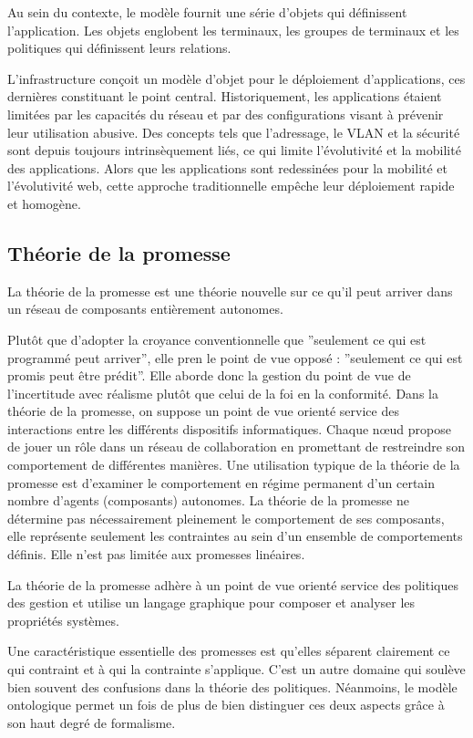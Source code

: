Au sein du contexte, le modèle fournit une série d'objets qui définissent
l'application. Les objets englobent les terminaux, les groupes de terminaux et
les politiques qui définissent leurs relations.

L'infrastructure conçoit un modèle d'objet pour le déploiement d'applications,
ces dernières constituant le point central. Historiquement, les applications
étaient limitées par les capacités du réseau et par des configurations visant à
prévenir leur utilisation abusive. Des concepts tels que l'adressage, le VLAN et
la sécurité sont depuis toujours intrinsèquement liés, ce qui limite
l'évolutivité et la mobilité des applications. Alors que les applications sont
redessinées pour la mobilité et l'évolutivité web, cette approche traditionnelle
empêche leur déploiement rapide et homogène.

\subsection{Théorie de la promesse}

La théorie de la promesse est une théorie nouvelle sur ce qu'il peut arriver
dans un réseau de composants entièrement autonomes.

Plutôt que d'adopter la croyance conventionnelle que ''seulement ce qui est
programmé peut arriver'', elle pren le point de vue opposé : ''seulement ce
qui est promis peut être prédit''. Elle aborde donc la gestion du point de vue
de l'incertitude avec réalisme plutôt que celui de la foi en la conformité. Dans
la théorie de la promesse, on suppose un point de vue orienté service des
interactions entre les différents dispositifs informatiques. Chaque nœud propose
de jouer un rôle dans un réseau de collaboration en promettant de restreindre
son comportement de différentes manières. Une utilisation typique de la théorie
de la promesse est d'examiner le comportement en régime permanent d'un certain
nombre d'agents (composants) autonomes. La théorie de la promesse ne détermine
pas nécessairement pleinement le comportement de ses composants, elle représente
seulement les contraintes au sein d'un ensemble de comportements définis. Elle
n'est pas limitée aux promesses linéaires.

La théorie de la promesse adhère à un point de vue orienté service des
politiques des gestion et utilise un langage graphique pour composer et analyser
les propriétés systèmes.

Une caractéristique essentielle des promesses est qu'elles séparent clairement
ce qui contraint et à qui la contrainte s'applique. C'est un autre domaine qui
soulève bien souvent des confusions dans la théorie des politiques. Néanmoins,
le modèle ontologique permet un fois de plus de bien distinguer ces deux
aspects grâce à son haut degré de formalisme.

